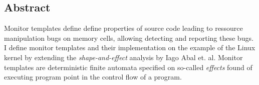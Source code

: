 \subsection*{Abstract}

Monitor templates define define properties of source code leading to ressource manipulation bugs on memory cells, allowing detecting and reporting these bugs. I define monitor templates and their implementation on the example of the Linux kernel by extending the \textit{shape-and-effect} analysis by Iago Abal et. al.
Monitor templates are deterministic finite automata specified on so-called \textit{effects} found of executing program point in the control flow of a program. 